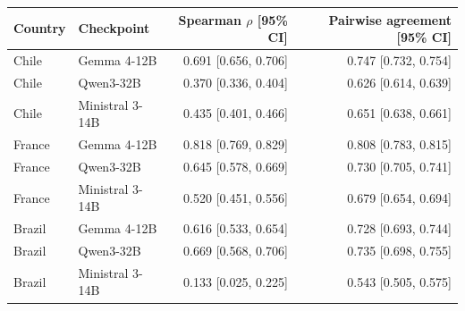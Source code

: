 \begin{tabular}{llrr}
\toprule
Country & Checkpoint & Spearman $\rho$ [95\% CI] & Pairwise agreement [95\% CI] \\
\midrule
Chile & Gemma 4-12B & 0.691 [0.656, 0.706] & 0.747 [0.732, 0.754] \\
Chile & Qwen3-32B & 0.370 [0.336, 0.404] & 0.626 [0.614, 0.639] \\
Chile & Ministral 3-14B & 0.435 [0.401, 0.466] & 0.651 [0.638, 0.661] \\
France & Gemma 4-12B & 0.818 [0.769, 0.829] & 0.808 [0.783, 0.815] \\
France & Qwen3-32B & 0.645 [0.578, 0.669] & 0.730 [0.705, 0.741] \\
France & Ministral 3-14B & 0.520 [0.451, 0.556] & 0.679 [0.654, 0.694] \\
Brazil & Gemma 4-12B & 0.616 [0.533, 0.654] & 0.728 [0.693, 0.744] \\
Brazil & Qwen3-32B & 0.669 [0.568, 0.706] & 0.735 [0.698, 0.755] \\
Brazil & Ministral 3-14B & 0.133 [0.025, 0.225] & 0.543 [0.505, 0.575] \\
\bottomrule
\end{tabular}
